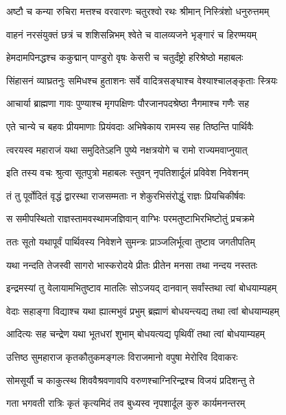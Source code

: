 \twolineshloka
{अष्टौ च कन्या रुचिरा मत्तश्च वरवारणः}
{चतुरश्वो रथः श्रीमान् निस्त्रिंशो धनुरुत्तमम्} %

\twolineshloka
{वाहनं नरसंयुक्तं छत्रं च शशिसन्निभम्}
{श्वेते च वालव्यजने भृङ्गारं च हिरण्मयम्} %

\twolineshloka
{हेमदामपिनद्धश्च ककुद्मान् पाण्डुरो वृषः}
{केसरी च चतुर्दंष्ट्रो हरिश्रेष्ठो महाबलः} %

\twolineshloka
{सिंहासनं व्याघ्रतनुः समिधश्च हुताशनः}
{सर्वे वादित्रसङ्घाश्च वेश्याश्चालङ्कृताः स्त्रियः} %

\twolineshloka
{आचार्या ब्राह्मणा गावः पुण्याश्च मृगपक्षिणः}
{पौरजानपदश्रेष्ठा नैगमाश्च गणैः सह} %

\twolineshloka
{एते चान्ये च बहवः प्रीयमाणाः प्रियंवदाः}
{अभिषेकाय रामस्य सह तिष्ठन्ति पार्थिवैः} %

\twolineshloka
{त्वरयस्व महाराजं यथा समुदितेऽहनि}
{पुष्ये नक्षत्रयोगे च रामो राज्यमवाप्नुयात्} %

\twolineshloka
{इति तस्य वचः श्रुत्वा सूतपुत्रो महाबलः}
{स्तुवन् नृपतिशार्दूलं प्रविवेश निवेशनम्} %

\twolineshloka
{तं तु पूर्वोदितं वृद्धं द्वारस्था राजसम्मताः}
{न शेकुरभिसंरोद्धुं राज्ञः प्रियचिकीर्षवः} %

\twolineshloka
{स समीपस्थितो राज्ञस्तामवस्थामजज्ञिवान्}
{वाग्भिः परमतुष्टाभिरभिष्टोतुं प्रचक्रमे} %

\twolineshloka
{ततः सूतो यथापूर्वं पार्थिवस्य निवेशने}
{सुमन्त्रः प्राञ्जलिर्भूत्वा तुष्टाव जगतीपतिम्} %

\twolineshloka
{यथा नन्दति तेजस्वी सागरो भास्करोदये}
{प्रीतः प्रीतेन मनसा तथा नन्दय नस्ततः} %

\twolineshloka
{इन्द्रमस्यां तु वेलायामभितुष्टाव मातलिः}
{सोऽजयद् दानवान् सर्वांस्तथा त्वां बोधयाम्यहम्} %

\twolineshloka
{वेदाः सहाङ्गा विद्याश्च यथा ह्यात्मभुवं प्रभुम्}
{ब्रह्माणं बोधयन्त्यद्य तथा त्वां बोधयाम्यहम्} %

\twolineshloka
{आदित्यः सह चन्द्रेण यथा भूतधरां शुभाम्}
{बोधयत्यद्य पृथिवीं तथा त्वां बोधयाम्यहम्} %

\twolineshloka
{उत्तिष्ठ सुमहाराज कृतकौतुकमङ्गलः}
{विराजमानो वपुषा मेरोरिव दिवाकरः} %

\twolineshloka
{सोमसूर्यौ च काकुत्स्थ शिववैश्रवणावपि}
{वरुणश्चाग्निरिन्द्रश्च विजयं प्रदिशन्तु ते} %

\twolineshloka
{गता भगवती रात्रिः कृतं कृत्यमिदं तव}
{बुध्यस्व नृपशार्दूल कुरु कार्यमनन्तरम्} %

